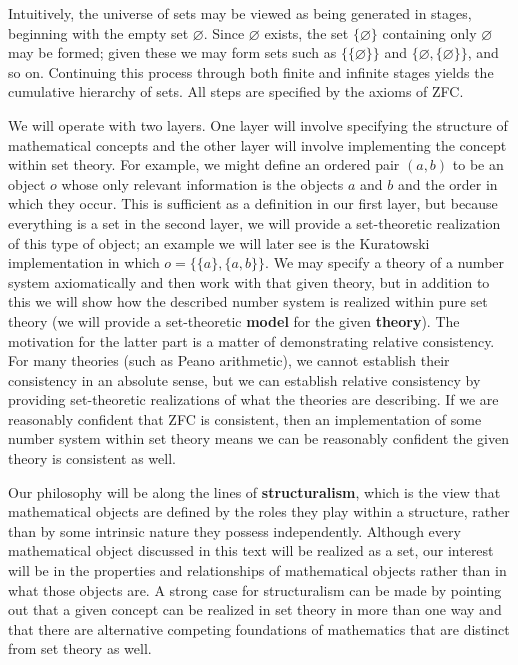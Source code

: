 Intuitively, the universe of sets may be viewed as being generated in stages, beginning with the empty set $\varnothing$. 
Since $\varnothing$ exists, the set $\{\varnothing\}$ containing only $\varnothing$ may be formed; given these we may form sets such as $\{\{\varnothing\}\}$ and $\{\varnothing, \{\varnothing\}\}$, and so on. 
Continuing this process through both finite and infinite stages yields the cumulative hierarchy of sets. 
All steps are specified by the axioms of ZFC. 

We will operate with two layers.
One layer will involve specifying the structure of mathematical concepts and the other layer will involve implementing the concept within set theory.
For example, we might define an ordered pair $(a, b)$ to be an object $o$ whose only relevant information is the objects $a$ and $b$ and the order in which they occur.
This is sufficient as a definition in our first layer, but because everything is a set in the second layer, we will provide a set-theoretic realization of this type of object; an example we will later see is the Kuratowski implementation in which $o = \{\{a\}, \{a, b\}\}$. 
We may specify a theory of a number system axiomatically and then work with that given theory, but in addition to this we will show how the described number system is realized within pure set theory (we will provide a set-theoretic \textbf{model} for the given \textbf{theory}). 
The motivation for the latter part is a matter of demonstrating relative consistency. 
For many theories (such as Peano arithmetic), we cannot establish their consistency in an absolute sense, but we can establish relative consistency by providing set-theoretic realizations of what the theories are describing. 
If we are reasonably confident that ZFC is consistent, then an implementation of some number system within set theory means we can be reasonably confident the given theory is consistent as well. 

Our philosophy will be along the lines of \textbf{structuralism}, which is the view that mathematical objects are defined by the roles they play within a structure, rather than by some intrinsic nature they possess independently.
Although every mathematical object discussed in this text will be realized as a set, our interest will be in the properties and relationships of mathematical objects rather than in what those objects are.
A strong case for structuralism can be made by pointing out that a given concept can be realized in set theory in more than one way and that there are alternative competing foundations of mathematics that are distinct from set theory as well. 

